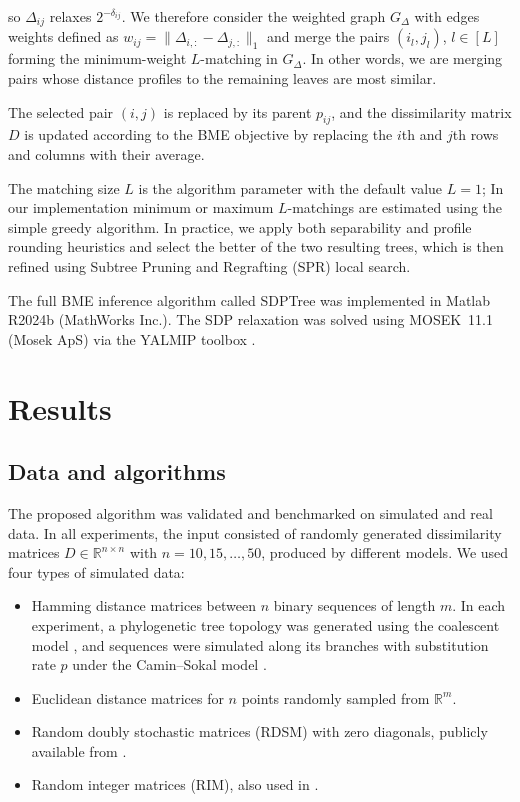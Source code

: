 \documentclass{article}
\begin{document}
\noindent
so $\Delta_{ij}$ relaxes $2^{-\delta_{ij}}$.
We therefore consider the weighted graph $G_{\Delta}$ with edges weights defined as $w_{ij} = \|\Delta_{i,:}-\Delta_{j,:}\|_1$ and merge the pairs $(i_l,j_l)$, $l\in [L]$ forming the minimum-weight $L$-matching in $G_{\Delta}$. In other words, we are merging pairs whose
distance profiles to the remaining leaves are most similar.

The selected pair $(i,j)$ is replaced by its parent $p_{ij}$, and the dissimilarity matrix $D$ is updated according to the
BME objective by replacing the $i$th and $j$th rows and columns with their average. 

The matching size $L$ is the algorithm parameter with the default value $L=1$; In our implementation minimum or maximum $L$-matchings are estimated using the simple greedy algorithm. In practice, we apply both separability and profile rounding heuristics and
select the better of the two resulting trees, which is then refined using Subtree Pruning and Regrafting (SPR) local search.

The full BME inference algorithm called SDPTree was implemented in Matlab R2024b (MathWorks Inc.). The SDP relaxation was solved using MOSEK~11.1 (Mosek ApS) via the YALMIP toolbox \cite{Lofberg2004}.

 \section{Results}

 \subsection{Data and algorithms}

The proposed algorithm was validated and benchmarked on simulated
and real data. In all experiments, the input consisted of randomly generated dissimilarity matrices
$D\in\mathbb{R}^{n\times n}$ with $n=10,15,\dots,50$, produced by different models. We used four types of simulated data:

 \begin{itemize}
     \item[1)] Hamming distance matrices between $n$ binary sequences
    of length $m$. In each experiment, a phylogenetic tree topology
    was generated using the coalescent model \cite{kingman1982genealogy},
    and sequences were simulated along its branches with substitution
    rate $p$ under the Camin--Sokal model \cite{Camin1965-eh}.  

     \item[2)] Euclidean distance matrices for $n$ points randomly sampled from $\mathbb{R}^m$.

     \item[3)] Random doubly stochastic matrices (RDSM) with zero diagonals, publicly available from \cite{catanzaro2025new}.

     \item[4)] Random integer matrices (RIM), also used in \cite{catanzaro2025new}.
 \end{itemize}
\end{document}
